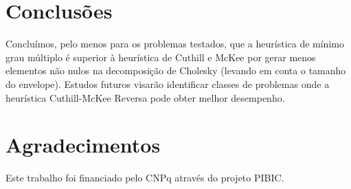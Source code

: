 \section{Conclusões}
Concluímos, pelo menos para os problemas testados, que a heurística de mínimo
grau múltiplo é superior à heurística de Cuthill e McKee por gerar menos
elementos não nulos na decomposição de Cholesky (levando em conta o tamanho do
envelope). Estudos futuros visarão identificar classes de problemas onde a
heurística Cuthill-McKee Reversa pode obter melhor desempenho.

\section*{Agradecimentos}
Este trabalho foi financiado pelo CNPq através do projeto PIBIC.

